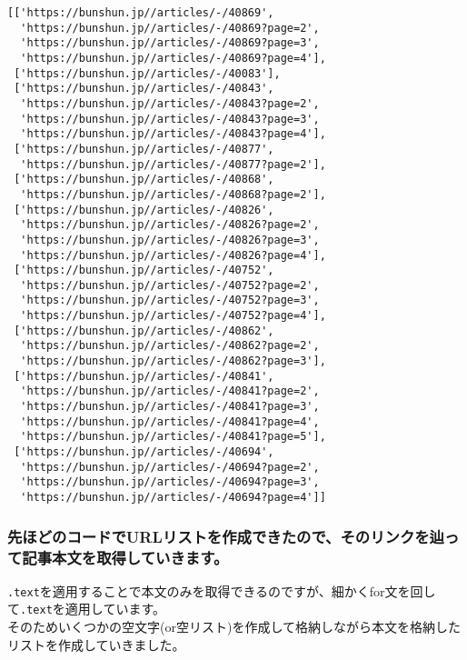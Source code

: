 \documentclass[11pt]{article}
\begin{document}
    
    \begin{verbatim}
[['https://bunshun.jp//articles/-/40869',
  'https://bunshun.jp//articles/-/40869?page=2',
  'https://bunshun.jp//articles/-/40869?page=3',
  'https://bunshun.jp//articles/-/40869?page=4'],
 ['https://bunshun.jp//articles/-/40083'],
 ['https://bunshun.jp//articles/-/40843',
  'https://bunshun.jp//articles/-/40843?page=2',
  'https://bunshun.jp//articles/-/40843?page=3',
  'https://bunshun.jp//articles/-/40843?page=4'],
 ['https://bunshun.jp//articles/-/40877',
  'https://bunshun.jp//articles/-/40877?page=2'],
 ['https://bunshun.jp//articles/-/40868',
  'https://bunshun.jp//articles/-/40868?page=2'],
 ['https://bunshun.jp//articles/-/40826',
  'https://bunshun.jp//articles/-/40826?page=2',
  'https://bunshun.jp//articles/-/40826?page=3',
  'https://bunshun.jp//articles/-/40826?page=4'],
 ['https://bunshun.jp//articles/-/40752',
  'https://bunshun.jp//articles/-/40752?page=2',
  'https://bunshun.jp//articles/-/40752?page=3',
  'https://bunshun.jp//articles/-/40752?page=4'],
 ['https://bunshun.jp//articles/-/40862',
  'https://bunshun.jp//articles/-/40862?page=2',
  'https://bunshun.jp//articles/-/40862?page=3'],
 ['https://bunshun.jp//articles/-/40841',
  'https://bunshun.jp//articles/-/40841?page=2',
  'https://bunshun.jp//articles/-/40841?page=3',
  'https://bunshun.jp//articles/-/40841?page=4',
  'https://bunshun.jp//articles/-/40841?page=5'],
 ['https://bunshun.jp//articles/-/40694',
  'https://bunshun.jp//articles/-/40694?page=2',
  'https://bunshun.jp//articles/-/40694?page=3',
  'https://bunshun.jp//articles/-/40694?page=4']]
    \end{verbatim}

    
    \hypertarget{ux5148ux307bux3069ux306eux30b3ux30fcux30c9ux3067urlux30eaux30b9ux30c8ux3092ux4f5cux6210ux3067ux304dux305fux306eux3067ux305dux306eux30eaux30f3ux30afux3092ux8fbfux3063ux3066ux8a18ux4e8bux672cux6587ux3092ux53d6ux5f97ux3057ux3066ux3044ux304dux307eux3059}{%
\subsubsection{先ほどのコードでURLリストを作成できたので、そのリンクを辿って記事本文を取得していきます。}\label{ux5148ux307bux3069ux306eux30b3ux30fcux30c9ux3067urlux30eaux30b9ux30c8ux3092ux4f5cux6210ux3067ux304dux305fux306eux3067ux305dux306eux30eaux30f3ux30afux3092ux8fbfux3063ux3066ux8a18ux4e8bux672cux6587ux3092ux53d6ux5f97ux3057ux3066ux3044ux304dux307eux3059}}

\texttt{.text}を適用することで本文のみを取得できるのですが、細かくfor文を回して\texttt{.text}を適用しています。\\
そのためいくつかの空文字(or空リスト)を作成して格納しながら本文を格納したリストを作成していきました。
\end{document}
